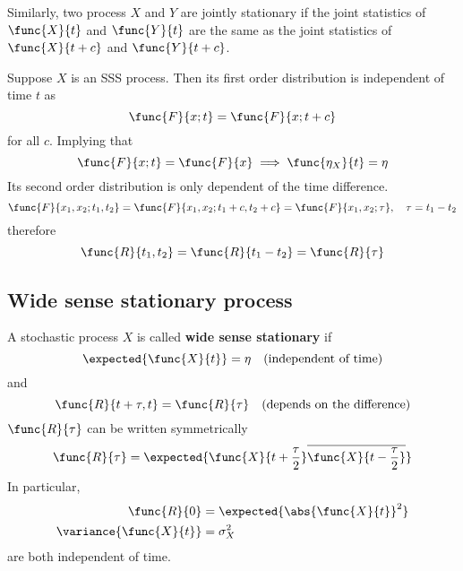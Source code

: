 Similarly, two process \(X\) and \(Y\) are jointly stationary if the joint statistics of \(\func{X}{t}\) and \(\func{Y}{t}\) are the same as the joint statistics of \(\func{X}{t+c}\) and \(\func{Y}{t +c}\).

\begin{example}
    Suppose \(X\) is an SSS process. Then its first order distribution is independent of time \(t\) as
    \begin{equation*}
        \func{F}{x; t} = \func{F}{x ; t+ c}
    \end{equation*}
    for all \(c\). Implying that 
    \begin{equation*}
        \func{F}{x;t} = \func{F}{x} \implies \func{\eta_X}{t} = \eta
    \end{equation*}
    Its second order distribution is only dependent of the time difference. 
    \begin{equation*}
        \func{F}{x_1, x_2 ; t_1, t_2} = \func{F}{x_1,x_2 ; t_1 + c , t_2 + c} = \func{F}{x_1, x_2 ; \tau}, \quad \tau  = t_1 - t_2
    \end{equation*}
    therefore 
    \begin{equation*}
        \func{R}{t_1,t_2} = \func{R}{t_1 - t_2} = \func{R}{\tau}
    \end{equation*}
\end{example}

\subsection{Wide sense stationary process} 
A stochastic process \(X\) is called \textbf{wide sense stationary} if 
\begin{equation*}
    \expected{\func{X}{t}} = \eta \quad (\text{independent of time})
\end{equation*}
and 
\begin{equation*}
    \func{R}{t + \tau , t} = \func{R}{\tau} \quad (\text{depends on the difference})
\end{equation*}
\(\func{R}{\tau}\) can be written symmetrically 
\begin{equation*}
    \func{R}{\tau} = \expected{\func{X}{t + \frac{\tau}{2}} \overline{\func{X}{t - \frac{\tau}{2}}}}
\end{equation*}
In particular, 
\begin{align*}
    \func{R}{0} &= \expected{\abs{\func{X}{t}}^2}\\
    \variance{\func{X}{t}} &= \sigma_X^2
\end{align*}
are both independent of time.

